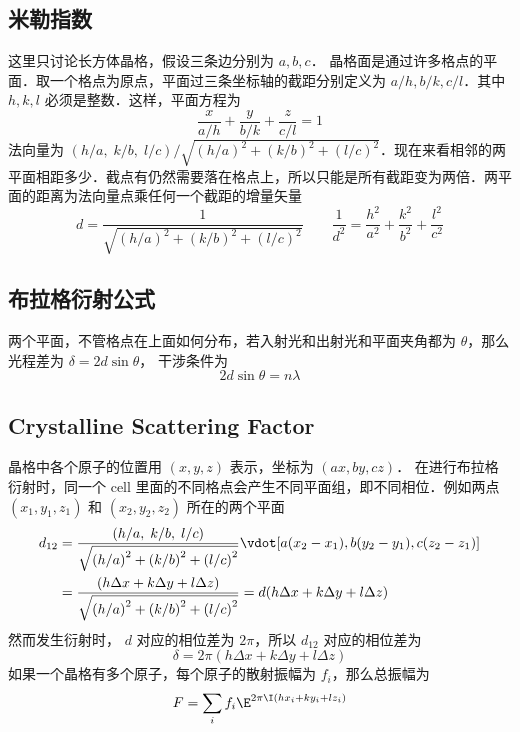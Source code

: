 
\subsection{米勒指数}

这里只讨论长方体晶格，假设三条边分别为 $a,b,c$．  晶格面是通过许多格点的平面．取一个格点为原点，平面过三条坐标轴的截距分别定义为 $a/h, b/k, c/l$．其中 $h,k,l$ 必须是整数．这样，平面方程为
\begin{equation}
\frac{x}{{a/h}} + \frac{y}{{b/k}} + \frac{z}{{c/l}} = 1
\end{equation}
法向量为 $(h/a,\;k/b,\;l/c)/\sqrt {{{(h/a)}^2} + {{(k/b)}^2} + {{(l/c)}^2}}$．现在来看相邻的两平面相距多少．截点有仍然需要落在格点上，所以只能是所有截距变为两倍．两平面的距离为法向量点乘任何一个截距的增量矢量
\begin{equation}
d = \frac{1}{{\sqrt {{{(h/a)}^2} + {{(k/b)}^2} + {{(l/c)}^2}} }}
\qquad
\frac{1}{{{d^2}}} = \frac{{{h^2}}}{{{a^2}}} + \frac{{{k^2}}}{{{b^2}}} + \frac{{{l^2}}}{{{c^2}}}
\end{equation}

\subsection{布拉格衍射公式}

两个平面，不管格点在上面如何分布，若入射光和出射光和平面夹角都为 $\theta$，那么光程差为 $\delta  = 2d\sin \theta$， 干涉条件为
\begin{equation}
2d\sin \theta  = n\lambda
\end{equation}

\subsection{Crystalline Scattering Factor}

晶格中各个原子的位置用 $(x,y,z)$ 表示，坐标为 $(ax,by,cz)$． 在进行布拉格衍射时，同一个 cell 里面的不同格点会产生不同平面组，即不同相位．例如两点 $({x_1},{y_1},{z_1})$ 和 $({x_2},{y_2},{z_2})$ 所在的两个平面
\begin{equation}
\begin{aligned}
{d_{12}} &= \frac{{(h/a,\;k/b,\;l/c)}}{{\sqrt {{{(h/a)}^2} + {{(k/b)}^2} + {{(l/c)}^2}} }} \vdot [a({x_2} - {x_1}),b({y_2} - {y_1}),c({z_2} - {z_1})] \\
&= \frac{{(h\Delta x + k\Delta y + l\Delta z)}}{{\sqrt {{{(h/a)}^2} + {{(k/b)}^2} + {{(l/c)}^2}} }} = d(h\Delta x + k\Delta y + l\Delta z)
\end{aligned}
\end{equation}
然而发生衍射时， $d$ 对应的相位差为 $2\pi$，所以 $d_{12}$ 对应的相位差为
\begin{equation}
\delta  = 2\pi (h\Delta x + k\Delta y + l\Delta z)
\end{equation}
如果一个晶格有多个原子，每个原子的散射振幅为 ${f_i}$，那么总振幅为
\begin{equation}
F = \sum\limits_i {{f_i}{\E^{2\pi \I(h{x_i} + k{y_i} + l{z_i})}}} 
\end{equation}


 



